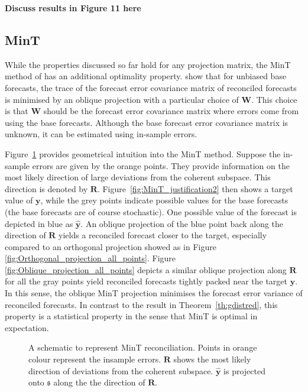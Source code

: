 \documentclass[12pt]{article}
\theoremstyle{definition}
\theoremstyle{property}
\begin{document}
	{\bf Discuss results in Figure 11 here} 
	
	
	\subsection{MinT}
	
	While the properties discussed so far hold for any projection matrix, the MinT method of \cite{WicEtAl2019} has an additional optimality property.  \cite{WicEtAl2019} show that for unbiased base forecasts, the trace of the forecast error covariance matrix of reconciled forecasts is minimised by an oblique projection with a particular choice of $\bm{W}$.  This choice is that $\bm{W}$ should be the forecast error covariance matrix where errors come from using the base forecasts.  Although the base forecast error covariance matrix is unknown, it can be estimated using in-sample errors.
	
	Figure~\ref{fig:MinT_justification1} provides geometrical intuition into the MinT method.  Suppose the in-sample errors are given by the orange points.  They provide information on the most likely direction of large deviations from the coherent subspace.  This direction is denoted by $\bm{R}$.  Figure~\ref{fig:MinT_justification2} then shows a target value of $\bm{y}$, while the grey points indicate possible values for the base forecasts (the base forecasts are of course stochastic).  One possible value of the forecast is depicted in blue as $\hat{\bm{y}}$.  An oblique projection of the blue point back along the direction of $\bm{R}$ yields a reconciled forecast closer to the target, especially compared to an orthogonal projection showed as in Figure \ref{fig:Orthogonal_projection_all_points}.  Figure \ref{fig:Oblique_projection_all_points} depicts a similar oblique projection along $\bm{R}$ for all the gray points yield reconciled forecasts tightly packed near the target $\bm{y}$.  In this sense, the oblique MinT projection minimises the forecast error variance of reconciled forecasts. In contrast to the result in Theorem~\ref{th:gdistred}, this property is a statistical property in the sense that MinT is optimal in expectation.
	
	\begin{figure}[H]
		\centering
		\small
		\resizebox{\linewidth}{!}{
			
		}
		\caption{A schematic to represent MinT reconciliation. Points in orange colour represent the insample errors. $\bm{R}$ shows the most likely direction of deviations from the coherent subspace. $\hat{\bm{y}}$ is projected onto $\mathfrak{s}$ along the the direction of $\bm{R}$.}\label{fig:MinT_justification1}
	\end{figure}
		
\end{document}
